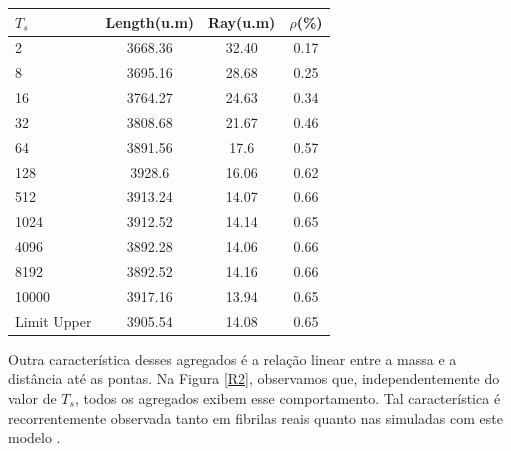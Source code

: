 \documentclass{article}
\begin{document}
\begin{table}[H]
        \centering  %
        \begin{tabular}{lccc}
        \hline
        \textbf{$T_{s}$} & \multicolumn{1}{c}{\textbf{Length(u.m)}} & \textbf{Ray(u.m)} & \textbf{\(\rho\)(\%)} \\ \hline
        2                & 3668.36                                   & 32.40             & 0.17                  \\
        8                & 3695.16                                   & 28.68             & 0.25                  \\
        16               & 3764.27                                   & 24.63             & 0.34                  \\
        32               & 3808.68                                   & 21.67             & 0.46                  \\
        64               & 3891.56                                   & 17.6              & 0.57                  \\
        128              & 3928.6                                    & 16.06             & 0.62                  \\
        512              & 3913.24                                   & 14.07             & 0.66                  \\
        1024             & 3912.52                                   & 14.14             & 0.65                  \\
        4096             & 3892.28                                   & 14.06             & 0.66                  \\
        8192             & 3892.52                                   & 14.16             & 0.66                  \\
        10000            & 3917.16                                   & 13.94             & 0.65                  \\ \hline
        \multicolumn{1}{l}{Limit Upper} & 3905.54                    & 14.08             & 0.65                  \\ \hline
        \end{tabular}
        \label{tab1}  %
    \end{table}


    Outra característica desses agregados é a relação linear entre a massa e a distância até as pontas. Na Figura 
    \ref{R2}, observamos que, independentemente do valor de \(T_{s}\), todos os agregados exibem esse comportamento. 
    Tal característica é recorrentemente observada tanto em fibrilas reais quanto nas simuladas com este modelo 
    \cite{Parkinson1995,Kadler1987}. 
\end{document}
